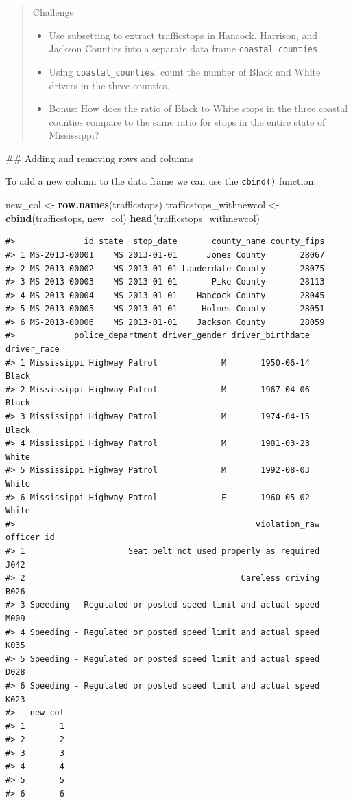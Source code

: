 \documentclass[
]{book}
\newenvironment{Shaded}{\begin{snugshade}}{\end{snugshade}}
\newcommand{\KeywordTok}[1]{\textcolor[rgb]{0.13,0.29,0.53}{\textbf{#1}}}
\newcommand{\NormalTok}[1]{#1}
\newcommand{\StringTok}[1]{\textcolor[rgb]{0.31,0.60,0.02}{#1}}
\providecommand{\tightlist}{%
  \setlength{\itemsep}{0pt}\setlength{\parskip}{0pt}}
\begin{document}
\begin{quote}
Challenge

\begin{itemize}
\tightlist
\item
  Use subsetting to extract trafficstops in Hancock, Harrison, and Jackson Counties into a separate data frame \texttt{coastal\_counties}.
\item
  Using \texttt{coastal\_counties}, count the number of Black and White drivers in the three counties.
\item
  Bonus: How does the ratio of Black to White stops in the three coastal counties compare to the same ratio for stops in the entire state of Mississippi?
\end{itemize}
\end{quote}

\#\# Adding and removing rows and columns

To add a new column to the data frame we can use the \texttt{cbind()} function.

\begin{Shaded}
\begin{Highlighting}[]
\NormalTok{new_col <-}\StringTok{ }\KeywordTok{row.names}\NormalTok{(trafficstops)}
\NormalTok{trafficstops_withnewcol <-}\StringTok{ }\KeywordTok{cbind}\NormalTok{(trafficstops, new_col)}
\KeywordTok{head}\NormalTok{(trafficstops_withnewcol)}
\end{Highlighting}
\end{Shaded}

\begin{verbatim}
#>              id state  stop_date       county_name county_fips
#> 1 MS-2013-00001    MS 2013-01-01      Jones County       28067
#> 2 MS-2013-00002    MS 2013-01-01 Lauderdale County       28075
#> 3 MS-2013-00003    MS 2013-01-01       Pike County       28113
#> 4 MS-2013-00004    MS 2013-01-01    Hancock County       28045
#> 5 MS-2013-00005    MS 2013-01-01     Holmes County       28051
#> 6 MS-2013-00006    MS 2013-01-01    Jackson County       28059
#>            police_department driver_gender driver_birthdate driver_race
#> 1 Mississippi Highway Patrol             M       1950-06-14       Black
#> 2 Mississippi Highway Patrol             M       1967-04-06       Black
#> 3 Mississippi Highway Patrol             M       1974-04-15       Black
#> 4 Mississippi Highway Patrol             M       1981-03-23       White
#> 5 Mississippi Highway Patrol             M       1992-08-03       White
#> 6 Mississippi Highway Patrol             F       1960-05-02       White
#>                                                 violation_raw officer_id
#> 1                     Seat belt not used properly as required       J042
#> 2                                            Careless driving       B026
#> 3 Speeding - Regulated or posted speed limit and actual speed       M009
#> 4 Speeding - Regulated or posted speed limit and actual speed       K035
#> 5 Speeding - Regulated or posted speed limit and actual speed       D028
#> 6 Speeding - Regulated or posted speed limit and actual speed       K023
#>   new_col
#> 1       1
#> 2       2
#> 3       3
#> 4       4
#> 5       5
#> 6       6
\end{verbatim}
\end{document}
